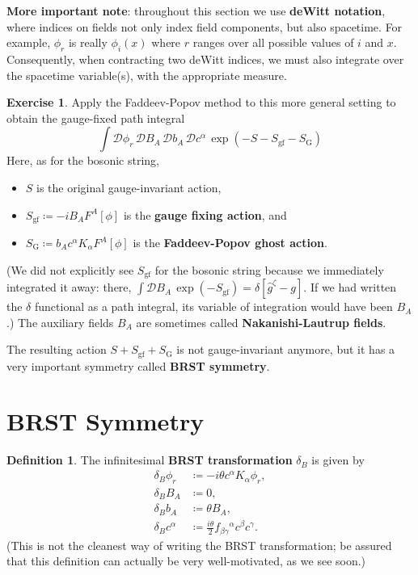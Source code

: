 \documentclass{report}
\theoremstyle{plain}
\theoremstyle{definition}
\newtheorem{definition}[theorem]{Definition}
\newtheorem{exercise}{Exercise}[section]
\theoremstyle{remark}
\newcommand{\cD}{\mathcal{D}}
\begin{document}
{\bf More important note}: throughout this section we use {\bf deWitt
  notation}, where indices on fields not only index field components,
but also spacetime. For example, $\phi_r$ is really $\phi_i(x)$ where
$r$ ranges over all possible values of $i$ and $x$. Consequently, when
contracting two deWitt indices, we must also integrate over the
spacetime variable(s), with the appropriate measure.

\begin{exercise}
  Apply the Faddeev-Popov method to this more general setting to
  obtain the gauge-fixed path integral
  \[ \int \cD \phi_r \, \cD B_A \, \cD b_A \, \cD c^\alpha \, \exp(-S - S_{\text{gf}} - S_{\text{G}}) \]
  Here, as for the bosonic string,
  \begin{itemize}
  \item $S$ is the original gauge-invariant action,
  \item $S_{\text{gf}} \coloneqq -i B_A F^A[\phi]$ is the {\bf gauge
    fixing action}, and
  \item $S_{\text{G}} \coloneqq b_A c^\alpha K_\alpha F^A[\phi]$ is
    the {\bf Faddeev-Popov ghost action}.
  \end{itemize}
  (We did not explicitly see $S_{\text{gf}}$ for the bosonic string
  because we immediately integrated it away: there, $\int \cD B_A \,
  \exp(-S_{\text{gf}}) = \delta[\hat{g}^\zeta - g]$. If we had written
  the $\delta$ functional as a path integral, its variable of
  integration would have been $B_A$.) The auxiliary fields $B_A$ are
  sometimes called {\bf Nakanishi-Lautrup fields}.
\end{exercise}

The resulting action $S + S_{\text{gf}} + S_{\text{G}}$ is not
gauge-invariant anymore, but it has a very important symmetry called
{\bf BRST symmetry}.

\section{BRST Symmetry}

\begin{definition}
  The infinitesimal {\bf BRST transformation} $\delta_B$ is given by
  \begin{align*}
    \delta_B\phi_r &\coloneqq -i\theta c^\alpha K_\alpha\phi_r, \\
    \delta_B B_A &\coloneqq 0, \\
    \delta_B b_A &\coloneqq \theta B_A, \\
    \delta_B c^\alpha &\coloneqq \frac{i\theta}{2} f_{\beta\gamma}{}^\alpha c^\beta c^\gamma.
  \end{align*}
  (This is not the cleanest way of writing the BRST transformation; be
  assured that this definition can actually be very well-motivated, as
  we see soon.)
\end{definition}
\end{document}
